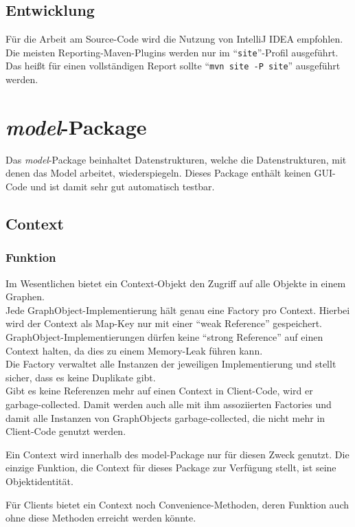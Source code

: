 \documentclass[accentcolor=tud0b,12pt,paper=a4]{tudreport}
\begin{document}
	\section{Entwicklung}
	Für die Arbeit am Source-Code wird die Nutzung von IntelliJ IDEA empfohlen.\\
	Die meisten Reporting-Maven-Plugins werden nur im "`\texttt{site}"'-Profil ausgeführt. Das heißt für einen vollständigen Report sollte "`\texttt{mvn site -P site}"' ausgeführt werden.\\
	
	\chapter{\textit{model}-Package}
	Das \textit{model}-Package beinhaltet Datenstrukturen, welche die Datenstrukturen, mit denen das Model arbeitet, wiederspiegeln.
	Dieses Package enthält keinen GUI-Code und ist damit sehr gut automatisch testbar.
	
	\section{Context}
		\subsection{Funktion}
			Im Wesentlichen bietet ein Context-Objekt den Zugriff auf alle Objekte in einem Graphen.\\
			Jede GraphObject-Implementierung hält genau eine Factory pro Context. Hierbei wird der Context als Map-Key nur mit einer "`weak Reference"' gespeichert. GraphObject-Implementierungen dürfen keine "`strong Reference"' auf einen Context halten, da dies zu einem Memory-Leak führen kann.\\
			Die Factory verwaltet alle Instanzen der jeweiligen Implementierung und stellt sicher, dass es keine Duplikate gibt.\\
			
			Gibt es keine Referenzen mehr auf einen Context in Client-Code, wird er garbage-collected. Damit werden auch alle mit ihm assoziierten Factories und damit alle Instanzen von GraphObjects garbage-collected, die nicht mehr in Client-Code genutzt werden.
			
			Ein Context wird innerhalb des model-Package nur für diesen Zweck genutzt. Die einzige Funktion, die Context für dieses Package zur Verfügung stellt, ist seine Objektidentität.
			
			Für Clients bietet ein Context noch Convenience-Methoden, deren Funktion auch ohne diese Methoden erreicht werden könnte.			
			
\end{document}
